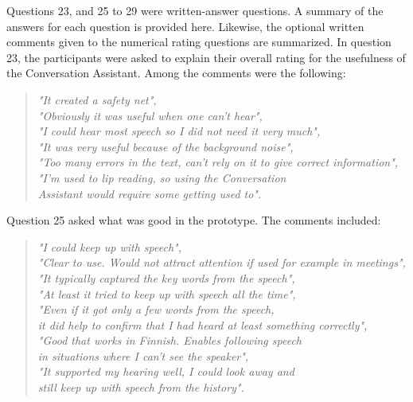 \documentclass[english, 12pt, a4paper, pdftex, elec, utf8]{aaltothesis}
\renewcommand{\baselinestretch}{1.02}
\begin{document}
Questions 23, and 25 to 29 were written-answer questions. A summary of the answers for each question is provided here. Likewise, the optional written comments given to the numerical rating questions are summarized. In question 23, the participants were asked to explain their overall rating for the usefulness of the Conversation Assistant. Among the comments were the following:
\begin{quote}
    \centering
    \renewcommand{\baselinestretch}{1.4}
    \textit{
    "It created a safety net", \\
    "Obviously it was useful when one can't hear", \\
    "I could hear most speech so I did not need it very much", \\
    "It was very useful because of the background noise", \\
    "Too many errors in the text, can't rely on it to give correct information", \\
    "I'm used to lip reading, so using the Conversation \\ Assistant would require some getting used to".}
\end{quote}
\vspace{1mm}
Question 25 asked what was good in the prototype. The comments included:
\begin{quote}
    \centering
    \renewcommand{\baselinestretch}{1.4}
    \textit{
        "I could keep up with speech", \\
        "Clear to use. Would not attract attention if used for example in meetings", \\
        "It typically captured the key words from the speech", \\
        "At least it tried to keep up with speech all the time", \\
        "Even if it got only a few words from the speech, \\ \vspace{-2.5mm} it did help to confirm that I had heard at least something correctly", \\
        "Good that works in Finnish. Enables following speech \\ \vspace{-2.5mm} in situations where I can't see the speaker", \\
        "It supported my hearing well, I could look away and \\ still keep up with speech from the history".}
\end{quote}
\vspace{1mm}
\end{document}

